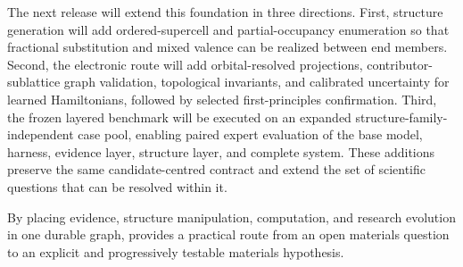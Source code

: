 The next release will extend this foundation in three directions.  First, structure generation will add ordered-supercell and partial-occupancy enumeration so that fractional substitution and mixed valence can be realized between end members.  Second, the electronic route will add orbital-resolved projections, contributor-sublattice graph validation, topological invariants, and calibrated uncertainty for learned Hamiltonians, followed by selected first-principles confirmation.  Third, the frozen layered benchmark will be executed on an expanded structure-family-independent case pool, enabling paired expert evaluation of the base model, \hermes harness, evidence layer, structure layer, and complete system.  These additions preserve the same candidate-centred contract and extend the set of scientific questions that can be resolved within it.

By placing evidence, structure manipulation, computation, and research evolution in one durable graph, \system provides a practical route from an open materials question to an explicit and progressively testable materials hypothesis.
